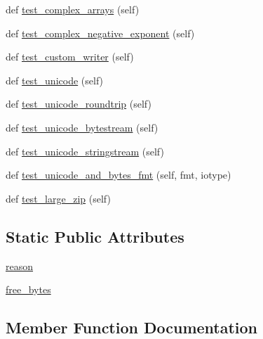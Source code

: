\begin{DoxyCompactItemize}
def \hyperlink{classnumpy_1_1lib_1_1tests_1_1test__io_1_1TestSaveTxt_a0cb74c9cbd3137994a64aa2664141ff8}{test\+\_\+complex\+\_\+arrays} (self)
\item 
def \hyperlink{classnumpy_1_1lib_1_1tests_1_1test__io_1_1TestSaveTxt_ad2233307eb2504ebd0e2e63b44e04348}{test\+\_\+complex\+\_\+negative\+\_\+exponent} (self)
\item 
def \hyperlink{classnumpy_1_1lib_1_1tests_1_1test__io_1_1TestSaveTxt_a9649a9e403310280423589468769c66a}{test\+\_\+custom\+\_\+writer} (self)
\item 
def \hyperlink{classnumpy_1_1lib_1_1tests_1_1test__io_1_1TestSaveTxt_aa73eee824c62a406ac6eadf510412ce3}{test\+\_\+unicode} (self)
\item 
def \hyperlink{classnumpy_1_1lib_1_1tests_1_1test__io_1_1TestSaveTxt_a44fa34e892721b70cf98a711a8ac66ea}{test\+\_\+unicode\+\_\+roundtrip} (self)
\item 
def \hyperlink{classnumpy_1_1lib_1_1tests_1_1test__io_1_1TestSaveTxt_a16aca12a0ddcda673fae7629611819d8}{test\+\_\+unicode\+\_\+bytestream} (self)
\item 
def \hyperlink{classnumpy_1_1lib_1_1tests_1_1test__io_1_1TestSaveTxt_adc4fcc03dee4af88e8cedf75cfb89812}{test\+\_\+unicode\+\_\+stringstream} (self)
\item 
def \hyperlink{classnumpy_1_1lib_1_1tests_1_1test__io_1_1TestSaveTxt_adc18029ae99398fcea1d2dc5674f93e6}{test\+\_\+unicode\+\_\+and\+\_\+bytes\+\_\+fmt} (self, fmt, iotype)
\item 
def \hyperlink{classnumpy_1_1lib_1_1tests_1_1test__io_1_1TestSaveTxt_acce26d4de48a784beaae2536bc058548}{test\+\_\+large\+\_\+zip} (self)
\end{DoxyCompactItemize}
\subsection*{Static Public Attributes}
\begin{DoxyCompactItemize}
\item 
\hyperlink{classnumpy_1_1lib_1_1tests_1_1test__io_1_1TestSaveTxt_ac98b112e4d4362acceaa57418500c2c3}{reason}
\item 
\hyperlink{classnumpy_1_1lib_1_1tests_1_1test__io_1_1TestSaveTxt_a9ab63d6c9572e64a09f38b3e239edbe3}{free\+\_\+bytes}
\end{DoxyCompactItemize}


\subsection{Member Function Documentation}
\mbox{\label{classnumpy_1_1lib_1_1tests_1_1test__io_1_1TestSaveTxt_ab5ea9b8f1e2cabca7301d39f81dd97db}} 
